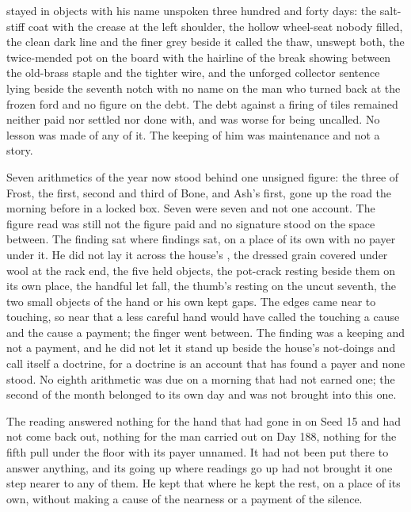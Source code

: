 stayed in objects with his name unspoken three hundred and forty days: the salt-stiff coat with the crease at the left shoulder, the hollow wheel-seat nobody filled, the clean dark line and the finer grey beside it called the thaw, unswept both, the twice-mended pot on the board with the hairline of the break showing between the old-brass staple and the tighter wire, and the unforged collector sentence lying beside the seventh notch with no name on the man who turned back at the frozen ford and no figure on the debt. The debt against a firing of tiles remained neither paid nor settled nor done with, and was worse for being uncalled. No lesson was made of any of it. The keeping of him was maintenance and not a story.

\scenebreak

Seven arithmetics of the year now stood behind one unsigned figure: the three of Frost, the first, second and third of Bone, and Ash's first, gone up the road the morning before in a locked box. Seven were seven and not one account. The figure read was still not the figure paid and no signature stood on the space between. The finding sat where findings sat, on a place of its own with no payer under it. He did not lay it across the house's , the dressed grain covered under wool at the rack end, the five held objects, the pot-crack resting beside them on its own place, the handful let fall, the thumb's resting on the uncut seventh, the two small objects of the hand or his own kept gaps. The edges came near to touching, so near that a less careful hand would have called the touching a cause and the cause a payment; the finger went between. The finding was a keeping and not a payment, and he did not let it stand up beside the house's not-doings and call itself a doctrine, for a doctrine is an account that has found a payer and none stood. No eighth arithmetic was due on a morning that had not earned one; the second of the month belonged to its own day and was not brought into this one.

The reading answered nothing for the hand that had gone in on Seed 15 and had not come back out, nothing for the man carried out on Day 188, nothing for the fifth pull under the floor with its payer unnamed. It had not been put there to answer anything, and its going up where readings go up had not brought it one step nearer to any of them. He kept that where he kept the rest, on a place of its own, without making a cause of the nearness or a payment of the silence.

